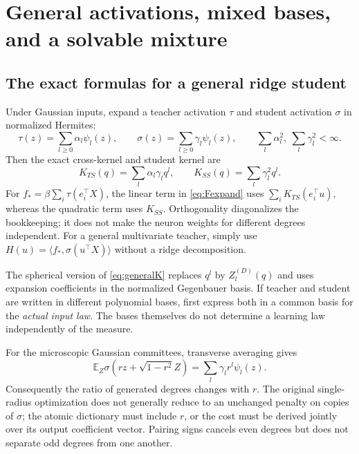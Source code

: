 \documentclass[11pt]{article}
\newcommand{\E}{\mathbb E}
\newcommand{\ip}[2]{\langle #1,#2\rangle}
\theoremstyle{remark}
\begin{document}
\section{General activations, mixed bases, and a solvable mixture}

\subsection{The exact formulas for a general ridge student}
Under Gaussian inputs, expand a teacher activation $\tau$ and student
activation $\sigma$ in normalized Hermites:
\begin{equation}
 \tau(z)=\sum_{l\geq0}\alpha_l\psi_l(z),\qquad
 \sigma(z)=\sum_{l\geq0}\gamma_l\psi_l(z),
 \qquad \sum_l\alpha_l^2,\ \sum_l\gamma_l^2<\infty.
\end{equation}
Then the exact cross-kernel and student kernel are
\begin{equation}\label{eq:generalK}
 K_{TS}(q)=\sum_l\alpha_l\gamma_lq^l,
 \qquad K_{SS}(q)=\sum_l\gamma_l^2q^l.
\end{equation}
For $f_*=\beta\sum_i\tau(e_i^\top X)$, the linear term in
\eqref{eq:Fexpand} uses $\sum_iK_{TS}(e_i^\top u)$, whereas the quadratic
term uses $K_{SS}$. Orthogonality diagonalizes the bookkeeping; it does not
make the neuron weights for different degrees independent. For a
general multivariate teacher, simply use
$H(u)=\ip{f_*}{\sigma(u^\top X)}$ without a ridge decomposition.

The spherical version of \eqref{eq:generalK} replaces $q^l$ by
$Z_l^{(D)}(q)$ and uses expansion coefficients in the normalized
Gegenbauer basis. If teacher and student are written in different
polynomial bases, first express both in a common basis for the
\emph{actual input law}. The bases themselves do not determine a learning
law independently of the measure.

For the microscopic Gaussian committees, transverse averaging gives
\begin{equation}\label{eq:mixedradius}
 \E_Z\sigma(rz+\sqrt{1-r^2}Z)=\sum_l\gamma_l r^l\psi_l(z).
\end{equation}
Consequently the ratio of generated degrees changes with $r$. The original
single-radius optimization does not generally reduce to an unchanged
penalty on copies of $\sigma$; the atomic dictionary must include $r$, or
the cost must be derived jointly over its output coefficient vector.
Pairing signs cancels even degrees but does not separate odd degrees
from one another.
\end{document}

